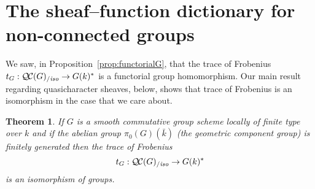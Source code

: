 \documentclass[11pt]{amsart}
\theoremstyle{plain}
\newtheorem{theorem}{Theorem}[section]
\theoremstyle{definition}
\theoremstyle{remark}
\newcommand{\bFq}{\bar{k}}
\newcommand{\Fq}{k}
\newcommand{\QC}{{\mathcal{Q\hskip-0.8pt C}}}
\newcommand{\QCiso}[1]{\QC(#1)_{/\textit{iso}}}
\newcommand{\trFrob}[1]{t_{#1}}
\begin{document}
\section{The sheaf--function dictionary for non-connected groups}
\label{sec:snake}

We saw, in Proposition~\ref{prop:functorialG}, that the trace of Frobenius
$\trFrob{G} : \QCiso{G} \to G(\Fq)^*$ is a functorial group homomorphism.
Our main result regarding quasicharacter sheaves, below, shows that
trace of Frobenius is an isomorphism in the case that we care about.

%
\begin{theorem}\label{thm:snake}
  If $G$ is a smooth commutative group scheme locally of finite type over
  $\Fq$ and if the abelian group $\pi_0(G)(\bFq)$ (the geometric
  component group) is finitely generated then the trace of Frobenius
  \[
  \trFrob{G} : \QCiso{G} \to G(\Fq)^*
  \]
  is an isomorphism of groups.
\end{theorem}
\end{document}
